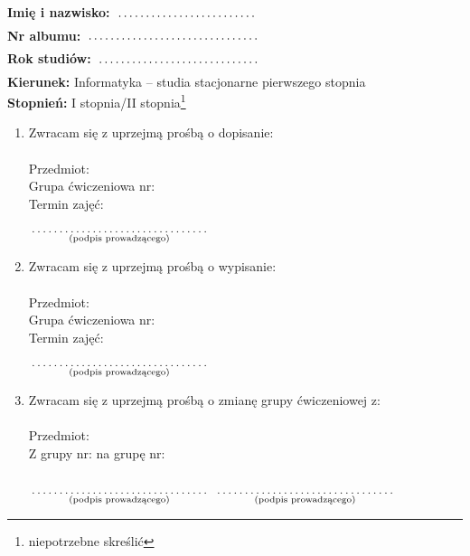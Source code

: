 \documentclass[a4paper,11pt]{article}
\newcommand{\fillField}[2]{
    $\underset{\text{#1}}{\parbox[t]{#2}{\dotfill}}$
}
\begin{document}
\noindent
\textbf{Imię i nazwisko:}   \fillField{}{4cm}\\
\textbf{Nr albumu:}   \fillField{}{4.9cm}\\
\textbf{Rok studiów:} \fillField{}{4.6cm}\\
\textbf{Kierunek:} Informatyka -- studia stacjonarne pierwszego stopnia\\
\textbf{Stopnień:} I stopnia/II stopnia\footnote[1]{niepotrzebne skreślić}

\vskip 2.0cm

\begin{enumerate}
    \item Zwracam się z uprzejmą prośbą o dopisanie: \\\\
    Przedmiot: \dotfill\\
    Grupa ćwiczeniowa nr: \dotfill\\
    Termin zajęć: \dotfill\\\\

    \hspace{\fill} \fillField{(podpis prowadzącego)}{5cm} \hspace{2.0cm}

    \vskip 1.0cm

    \item Zwracam się z uprzejmą prośbą o wypisanie: \\\\
    Przedmiot: \dotfill\\
    Grupa ćwiczeniowa nr: \dotfill\\
    Termin zajęć: \dotfill\\\\

    \hspace{\fill} \fillField{(podpis prowadzącego)}{5cm} \hspace{2.0cm}

    \vskip 1.0cm

    \item Zwracam się z uprzejmą prośbą o zmianę grupy ćwiczeniowej z: \\\\
    Przedmiot: \dotfill\\
    Z grupy nr: \dotfill na grupę nr: \dotfill\\\\

    \fillField{(podpis prowadzącego)}{5cm} \hspace{5.0cm} \fillField{(podpis prowadzącego)}{5cm}

\end{enumerate}
\end{document}
